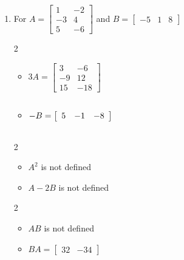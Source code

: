 \documentclass{ximera}
\begin{document}
\begin{enumerate}
\item For $A = \left[ \begin{array}{rr} 1 & -2 \\ -3 & 4 \\ 5 & -6 \end{array} \right]$ and $B=\left[ \begin{array}{rrr} -5 & 1 & 8 \end{array} \right]$

\begin{multicols}{2}
\begin{itemize}
\item  $3A = \left[ \begin{array}{rr} 3 & -6 \\ -9 & 12 \\ 15 & -18 \end{array} \right]$

\item $-B = \left[ \begin{array}{rrr} 5 & -1 & -8 \end{array} \right] \vphantom{\left[ \begin{array}{rr} 3 & -6 \\ -9 & 12 \\ 15 & -18 \end{array} \right]}$

\end{itemize}
\end{multicols}


\begin{multicols}{2}
\begin{itemize}

\item $A^2$ is not defined

\item  $A-2B$ is not defined

\end{itemize}
\end{multicols}

\begin{multicols}{2}
\begin{itemize}

\item $AB$ is not defined

\item $BA = \left[ \begin{array}{rr} 32 & -34 \end{array} \right]$

\end{itemize}
\end{multicols}


\end{enumerate}
\end{document}
